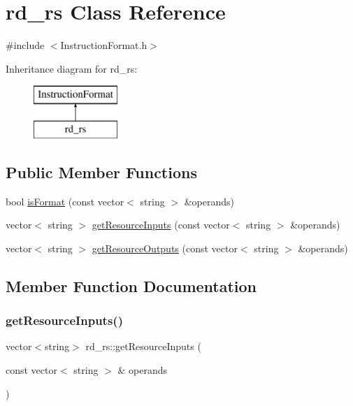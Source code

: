 \hypertarget{classrd__rs}{}\section{rd\+\_\+rs Class Reference}
\label{classrd__rs}


{\ttfamily \#include $<$Instruction\+Format.\+h$>$}

Inheritance diagram for rd\+\_\+rs\+:\begin{figure}[H]
\begin{center}
\leavevmode
\includegraphics[height=2.000000cm]{classrd__rs}
\end{center}
\end{figure}
\subsection*{Public Member Functions}
\begin{DoxyCompactItemize}
\item 
bool \hyperlink{classrd__rs_a11e48da979b9ac645d90fc9bbdbfc444}{is\+Format} (const vector$<$ string $>$ \&operands)
\item 
vector$<$ string $>$ \hyperlink{classrd__rs_a0e0013c3f91637813f475c12f8062e3e}{get\+Resource\+Inputs} (const vector$<$ string $>$ \&operands)
\item 
vector$<$ string $>$ \hyperlink{classrd__rs_a52ac7e75ebef24ff1ac211d8dd0e4f5d}{get\+Resource\+Outputs} (const vector$<$ string $>$ \&operands)
\end{DoxyCompactItemize}


\subsection{Member Function Documentation}
\mbox{\label{classrd__rs_a0e0013c3f91637813f475c12f8062e3e}} 
\subsubsection{\texorpdfstring{get\+Resource\+Inputs()}{getResourceInputs()}}
{\footnotesize\ttfamily vector$<$string$>$ rd\+\_\+rs\+::get\+Resource\+Inputs (\begin{DoxyParamCaption}\item[{const vector$<$ string $>$ \&}]{operands }\end{DoxyParamCaption})\hspace{0.3cm}{\ttfamily [virtual]}}

